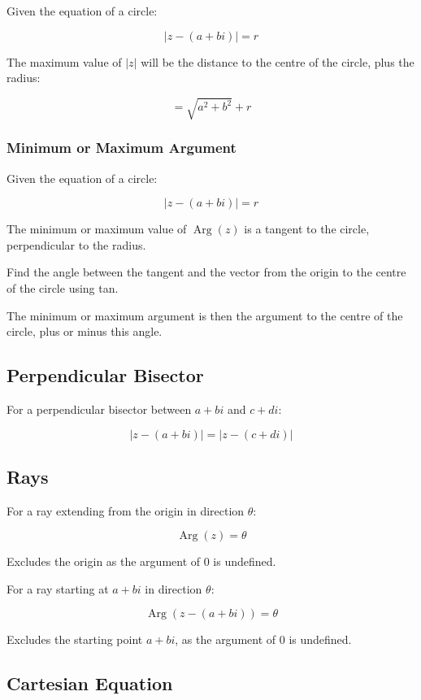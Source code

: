 \documentclass[a4paper,11pt]{article}
\DeclareMathOperator\Arg{Arg}
\begin{document}
Given the equation of a circle:

$$
\lvert z - (a + bi) \rvert = r
$$

The maximum value of $\lvert z \rvert$ will be the distance to the centre of
the circle, plus the radius:

$$
= \sqrt{a^2 + b^2} + r
$$


\subsubsection{Minimum or Maximum Argument}

Given the equation of a circle:

$$
\lvert z - (a + bi) \rvert = r
$$

The minimum or maximum value of $\Arg(z)$ is a tangent to the circle,
perpendicular to the radius.

Find the angle between the tangent and the vector from the origin to the centre
of the circle using tan.

The minimum or maximum argument is then the argument to the centre of the
circle, plus or minus this angle.


\subsection{Perpendicular Bisector}

For a perpendicular bisector between $a + bi$ and $c + di$:

$$
\lvert z - (a + bi) \rvert = \lvert z - (c + di) \rvert
$$


\subsection{Rays}

For a ray extending from the origin in direction $\theta$:

$$
\Arg(z) = \theta
$$

Excludes the origin as the argument of 0 is undefined.

For a ray starting at $a + bi$ in direction $\theta$:

$$
\Arg(z - (a + bi)) = \theta
$$

Excludes the starting point $a + bi$, as the argument of 0 is undefined.


\subsection{Cartesian Equation}
\end{document}
